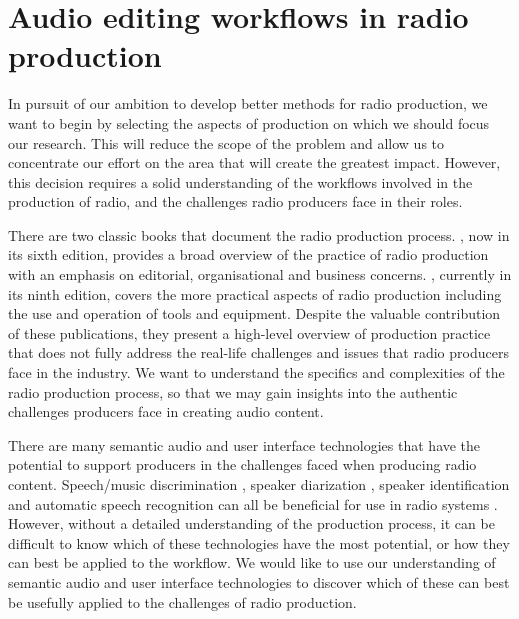 \chapter{Audio editing workflows in radio production}\label{chp:ethno}

In pursuit of our ambition to develop better methods for radio production, we want to begin by selecting the aspects of
production on which we should focus our research. This will reduce the scope of the problem and allow us to concentrate
our effort on the area that will create the greatest impact.  However, this decision requires a solid understanding of
the workflows involved in the production of radio, and the challenges radio producers face in their roles.


There are two classic books that document the radio production process. \citet{McLeish2015}, now in its sixth edition,
provides a broad overview of the practice of radio production with an emphasis on editorial, organisational and
business concerns.  \citet{Hausman2012}, currently in its ninth edition, covers the more practical aspects of radio
production including the use and operation of tools and equipment.  Despite the valuable contribution of these
publications, they present a high-level overview of production practice that does not fully address the real-life
challenges and issues that radio producers face in the industry.  We want to understand the specifics and complexities
of the radio production process, so that we may gain insights into the authentic challenges producers face in creating
audio content.


There are many semantic audio and user interface technologies that have the potential to support producers in the
challenges faced when producing radio content. Speech/music discrimination \citep{Wieser2014}, speaker diarization
\citep{AngueraMiro2012}, speaker identification \citep{Lee1999a} and automatic speech recognition \citep{Junqua1995}
can all be beneficial for use in radio systems \citep{Raimond2014,Bell2015}.  However, without a detailed understanding
of the production process, it can be difficult to know which of these technologies have the most potential, or how they
can best be applied to the workflow.
We would like to use our understanding of semantic audio and user interface technologies to discover which of these
can best be usefully applied to the challenges of radio production.

